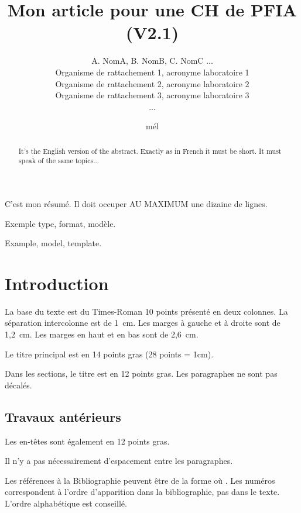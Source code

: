 \documentclass[french]{pfia}
\title{\textbf{Mon  article pour une CH de PFIA (V2.1)}}
\author{A. NomA\fup{1}, B. NomB\fup{2}, C. NomC\fup{1,3} ...\\[6pt]
\fup{1} Organisme de rattachement 1, acronyme laboratoire 1\\
\fup{2} Organisme de rattachement 2, acronyme laboratoire 2\\
\fup{3} Organisme de rattachement 3, acronyme laboratoire 3\\
...}
\date{mél}
\begin{document}
\maketitle


\begin{resume}
C'est mon résumé. Il doit occuper AU MAXIMUM une dizaine de lignes.
\end{resume}

\begin{motscles}
Exemple type, format, modèle.
\end{motscles}

\begin{abstract}
It's the English version of the abstract. Exactly as in French it must be short. It must speak of the same topics...  
\end{abstract}

\begin{keywords}
Example, model, template.
\end{keywords}


\section{Introduction}

La base du texte est du Times-Roman 10 points présenté en deux colonnes. La séparation intercolonne est de 1~cm. 
Les marges à gauche et à droite sont de 1,2~cm. Les marges en haut et en bas sont de 2,6~cm.

Le titre principal est en 14 points gras (28 points = 1cm).

Dans les sections, le titre est en 12 points gras.
Les paragraphes ne sont pas décalés.

\subsection{Travaux antérieurs}

Les en-têtes sont également en 12 points gras.

Il n'y a pas nécessairement d'espacement entre les paragraphes.

Les références à la Bibliographie peuvent être de la forme
 \cite{key:foo} o\`u \cite{foo:baz}.  Les numéros correspondent à
 l'ordre d'apparition dans la bibliographie, pas dans le texte.
 L'ordre alphabétique est conseillé.
\end{document}
